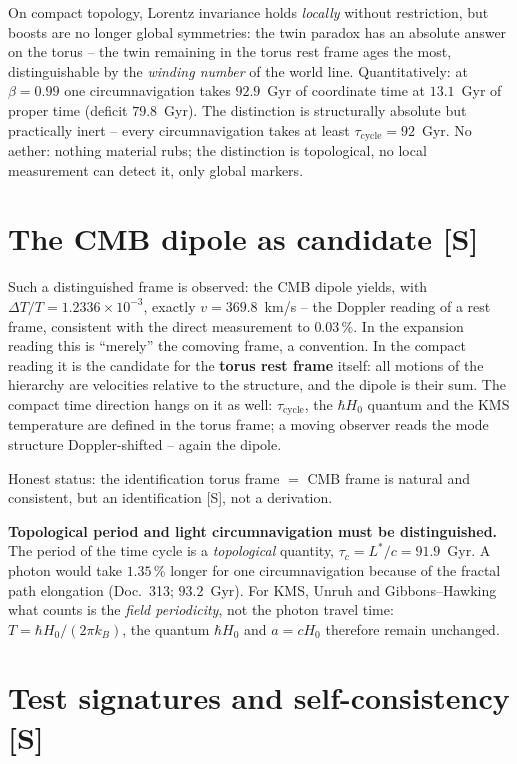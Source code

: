 On compact topology, Lorentz invariance holds \emph{locally}
without restriction, but boosts are no longer global symmetries:
the twin paradox has an absolute answer on the torus -- the twin
remaining in the torus rest frame ages the most, distinguishable
by the \emph{winding number} of the world line. Quantitatively: at
$\beta = 0.99$ one circumnavigation takes $92.9$~Gyr of coordinate
time at $13.1$~Gyr of proper time (deficit $79.8$~Gyr). The
distinction is structurally absolute but practically inert --
every circumnavigation takes at least
$\tau_\text{cycle} = 92$~Gyr. No aether: nothing material rubs;
the distinction is topological, no local measurement can detect
it, only global markers.

\section{The CMB dipole as candidate [S]}

Such a distinguished frame is observed: the CMB dipole yields, with
$\Delta T/T = 1.2336\times10^{-3}$, exactly $v = 369.8$~km/s --
the Doppler reading of a rest frame, consistent with the direct
measurement to $0.03\,\%$. In the expansion reading this is
\enquote{merely} the comoving frame, a convention. In the compact
reading it is the candidate for the \textbf{torus rest frame}
itself: all motions of the hierarchy are velocities relative to
the structure, and the dipole is their sum. The compact time
direction hangs on it as well: $\tau_\text{cycle}$, the
$\hbar H_0$ quantum and the KMS temperature are defined in the
torus frame; a moving observer reads the mode structure
Doppler-shifted -- again the dipole.

Honest status: the identification torus frame $=$ CMB frame is
natural and consistent, but an identification [S], not a
derivation.

\textbf{Topological period and light circumnavigation must be
distinguished.} The period of the time cycle is a
\emph{topological} quantity, $\tau_c = L^{*}/c = 91.9$~Gyr. A
photon would take $1.35\,\%$ longer for one circumnavigation
because of the fractal path elongation (Doc.~313; $93.2$~Gyr).
For KMS, Unruh and Gibbons--Hawking what counts is the
\emph{field periodicity}, not the photon travel time:
$T = \hbar H_0/(2\pi k_B)$, the quantum $\hbar H_0$ and
$a = cH_0$ therefore remain unchanged.

\section{Test signatures and self-consistency [S]}

